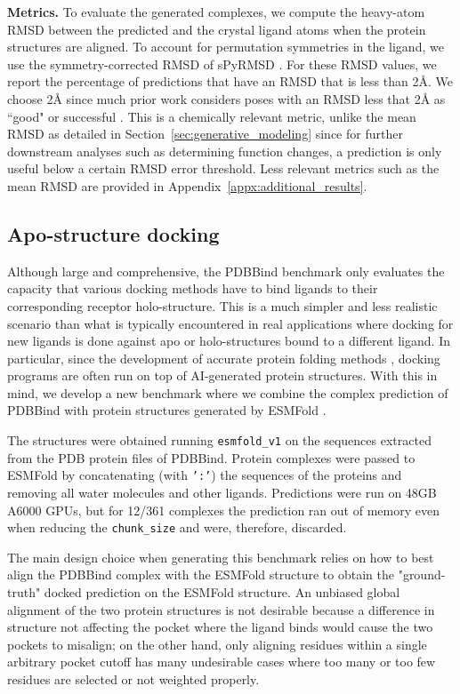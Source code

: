 \documentclass{article} \usepackage{iclr2023_conference,times}
\begin{document}
\textbf{Metrics.} To evaluate the generated complexes, we compute the heavy-atom RMSD between the predicted and the crystal ligand atoms when the protein structures are aligned. To account for permutation symmetries in the ligand, we use the symmetry-corrected RMSD of sPyRMSD \citep{spyrmsd2020}. For these RMSD values, we report the percentage of predictions that have an RMSD that is less than 2\AA{}.  We choose 2\AA{} since much prior work considers poses with an RMSD less that 2\AA{} as ``good" or successful \citep{Alhossary2015QuickVina2, Hassan2017QVinaW, mcnutt2021gnina}. This is a chemically relevant metric, unlike the mean RMSD as detailed in Section~\ref{sec:generative_modeling} since for further downstream analyses such as determining function changes, a prediction is only useful below a certain RMSD error threshold. Less relevant metrics such as the mean RMSD are provided in Appendix~\ref{appx:additional_results}.


\subsection{Apo-structure docking}\label{appx:apodocking}

Although large and comprehensive, the PDBBind benchmark only evaluates the capacity that various docking methods have to bind ligands to their corresponding receptor holo-structure. This is a much simpler and less realistic scenario than what is typically encountered in real applications where docking for new ligands is done against apo or holo-structures bound to a different ligand. In particular, since the development of accurate protein folding methods \citep{jumper2021highly}, docking programs are often run on top of AI-generated protein structures. With this in mind, we develop a new benchmark where we combine the complex prediction of PDBBind with protein structures generated by ESMFold \citep{Lin2022ESM2}. 

The structures were obtained running \texttt{esmfold\_v1} on the sequences extracted from the PDB protein files of PDBBind. Protein complexes were passed to ESMFold by concatenating (with \texttt{':'}) the sequences of the proteins and removing all water molecules and other ligands. Predictions were run on 48GB A6000 GPUs, but for 12/361 complexes the prediction ran out of memory even when reducing the \texttt{chunk\_size} and were, therefore, discarded.   

The main design choice when generating this benchmark relies on how to best align the PDBBind complex with the ESMFold structure to obtain the "ground-truth" docked prediction on the ESMFold structure. An unbiased global alignment of the two protein structures is not desirable because a difference in structure not affecting the pocket where the ligand binds would cause the two pockets to misalign; on the other hand, only aligning residues within a single arbitrary pocket cutoff has many undesirable cases where too many or too few residues are selected or not weighted properly. 
\end{document}
